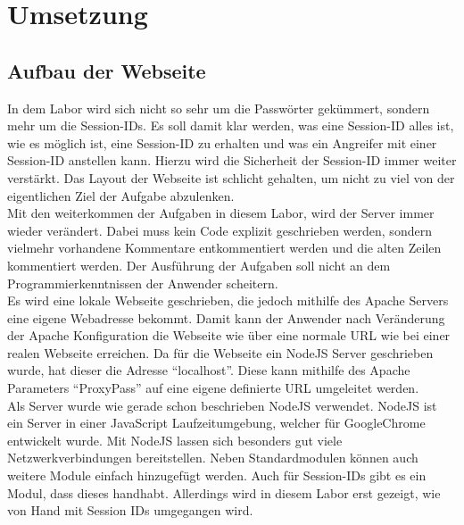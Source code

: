 \chapter{Umsetzung}
\section{Aufbau der Webseite}
In dem Labor wird sich nicht so sehr um die Passwörter gekümmert, sondern mehr um die Session-IDs. Es soll damit klar werden, was eine Session-ID alles ist, wie es möglich ist, eine Session-ID zu erhalten und was ein Angreifer mit einer Session-ID anstellen kann. Hierzu wird die Sicherheit der Session-ID immer weiter verstärkt. Das Layout der Webseite ist schlicht gehalten, um nicht zu viel von der eigentlichen Ziel der Aufgabe abzulenken. \\
Mit den weiterkommen der Aufgaben in diesem Labor, wird der Server immer wieder verändert. Dabei muss kein Code explizit geschrieben werden, sondern vielmehr vorhandene Kommentare entkommentiert werden und die alten Zeilen kommentiert werden. Der Ausführung der Aufgaben soll nicht an dem Programmierkenntnissen der Anwender scheitern. \\
Es wird eine lokale Webseite geschrieben, die jedoch mithilfe des Apache Servers eine eigene Webadresse bekommt. Damit kann der Anwender nach Veränderung der Apache Konfiguration die Webseite wie über eine normale URL wie bei einer realen Webseite erreichen. Da für die Webseite ein NodeJS Server geschrieben wurde, hat dieser die Adresse \enquote{localhost}. Diese kann mithilfe des Apache Parameters \enquote{ProxyPass} auf eine eigene definierte URL umgeleitet werden. \\
Als Server wurde wie gerade schon beschrieben NodeJS verwendet. NodeJS ist ein Server in einer JavaScript Laufzeitumgebung, welcher für GoogleChrome entwickelt wurde. Mit NodeJS lassen sich besonders gut viele Netzwerkverbindungen bereitstellen. Neben Standardmodulen können auch weitere Module einfach hinzugefügt werden. Auch für Session-IDs gibt es ein Modul, dass dieses handhabt. Allerdings wird in diesem Labor erst gezeigt, wie von Hand mit Session IDs umgegangen wird. 
